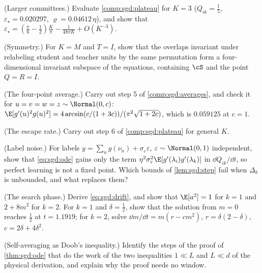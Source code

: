 \begin{refsection}
\begin{exercises}
\item \consolidation (Larger committees.) Evaluate \cref{comp:sgd:plateau} for $K=3$ ($Q_{ik}=\frac15$, $\varepsilon_\star=0.020297$, $\varrho=0.04612\,\eta$), and show that $\varepsilon_\star=(\frac\pi6-\frac12)\frac K\pi-\frac1{48\pi K}+O(K^{-3})$.\label{ex:sgd:largeK}

\item \consolidation (Symmetry.) For $K=M$ and $T=I$, show that the overlaps invariant under relabeling student and teacher units by the same permutation form a four-dimensional invariant subspace of the equations, containing $\cS$ and the point $Q=R=I$.\label{ex:sgd:symmetry}

\item \byhand (The four-point average.) Carry out step 5 of \cref{comp:sgd:averages}, and check it for $u=v=w=z\sim\Normal(0,c)$: $\E[g'(u)^2g(u)^2]=4\arcsin(c/(1+3c))/(\pi^2\sqrt{1+2c})$, which is $0.059125$ at $c=1$.\label{ex:sgd:four}

\item \byhand (The escape rate.) Carry out step 6 of \cref{comp:sgd:plateau} for general $K$. \label{ex:sgd:escape}

\item \byhand (Label noise.) For labels $y=\sum_ng(\nu_n)+\sigma_\varepsilon\varepsilon$, $\varepsilon\sim\Normal(0,1)$ independent, show that \eqref{eq:sgd:ode} gains only the term $\eta^2\sigma_\varepsilon^2\E[g'(\lambda_i)g'(\lambda_k)]$ in $\dd Q_{ik}/\dd t$, so perfect learning is not a fixed point. Which bounds of \cref{lem:sgd:step} fail when $\Delta_k$ is unbounded, and what replaces them?\label{ex:sgd:noise}

\item \byhand (The search phase.) Derive \eqref{eq:sgd:drift}, and show that $\E[a^2]=1$ for $k=1$ and $2+8m^2$ for $k=2$. For $k=1$ and $\delta=\frac12$, show that the solution from $m=0$ reaches $\frac12$ at $t=1.1919$; for $k=2$, solve $\dd m/\dd t=m(r-cm^2)$, $r=\delta(2-\delta)$, $c=2\delta+4\delta^2$.\label{ex:sgd:search}

\item \translate (Self-averaging as Doob's inequality.) Identify the steps of the proof of \cref{thm:sgd:ode} that do the work of the two inequalities $1\ll L$ and $L\ll d$ of the physical derivation, and explain why the proof needs no window.\label{ex:sgd:window}


\end{exercises}
\end{refsection}
